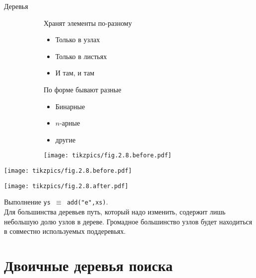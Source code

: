 \begin{frame}{Деревья}
\begin{figure}[ht]
\begin{subfigure}{.49\textwidth}
Хранят элементы по-разному
\begin{itemize}
\item Только в узлах
\item Только в листьях
\item И там, и там
\end{itemize}
\vspace{1em}
По форме бывают разные
\begin{itemize}
\item Бинарные
\item $n$-арные
\item другие
\end{itemize}
\end{subfigure}
\begin{subfigure}{.49\textwidth}
\texttt{[image: tikzpics/fig.2.8.before.pdf]}\par
\end{subfigure}
\end{figure}
\end{frame}


\begin{frame}
\begin{minipage}{\textwidth}
\begin{minipage}[t]{.48\textwidth}\vspace{0em}
  \texttt{[image: tikzpics/fig.2.8.before.pdf]}\par
\end{minipage}
\begin{minipage}[t]{.48\textwidth}\vspace{0em}
  \texttt{[image: tikzpics/fig.2.8.after.pdf]}\par
\end{minipage}
\end{minipage}
Выполнение \texttt{ys $\equiv$ add("e",xs)}.\\

Для большинства деревьев путь, который надо изменить, содержит лишь небольшую долю узлов в дереве. Громадное
большинство узлов будет находиться в совместно используемых поддеревьях.
\end{frame}

\section{Двоичные деревья поиска}

